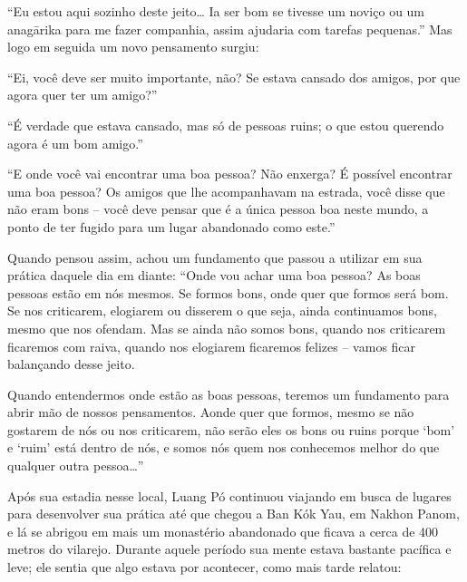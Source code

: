 ``Eu estou aqui sozinho deste jeito\ldots{} Ia ser bom se tivesse um
noviço ou um anagārika para me fazer companhia, assim ajudaria com
tarefas pequenas.'' Mas logo em seguida um novo pensamento surgiu:

``Ei, você deve ser muito importante, não? Se estava cansado dos amigos,
por que agora quer ter um amigo?''

``É verdade que estava cansado, mas só de pessoas ruins; o que estou
querendo agora é um bom amigo.''

``E onde você vai encontrar uma boa pessoa? Não enxerga? É possível
encontrar uma boa pessoa? Os amigos que lhe acompanhavam na estrada,
você disse que não eram bons -- você deve pensar que é a única pessoa
boa neste mundo, a ponto de ter fugido para um lugar abandonado como
este.''

Quando pensou assim, achou um fundamento que passou a utilizar em sua
prática daquele dia em diante: ``Onde vou achar uma boa pessoa? As boas
pessoas estão em nós mesmos. Se formos bons, onde quer que formos será
bom. Se nos criticarem, elogiarem ou disserem o que seja, ainda
continuamos bons, mesmo que nos ofendam. Mas se ainda não somos bons,
quando nos criticarem ficaremos com raiva, quando nos elogiarem
ficaremos felizes -- vamos ficar balançando desse jeito.

Quando entendermos onde estão as boas pessoas, teremos um fundamento
para abrir mão de nossos pensamentos. Aonde quer que formos, mesmo se
não gostarem de nós ou nos criticarem, não serão eles os bons ou ruins
porque `bom' e `ruim' está dentro de nós, e somos nós quem nos
conhecemos melhor do que qualquer outra pessoa\ldots{}''

Após sua estadia nesse local, Luang Pó continuou viajando em busca de
lugares para desenvolver sua prática até que chegou a Ban Kók Yau, em
Nakhon Panom, e lá se abrigou em mais um monastério abandonado que
ficava a cerca de 400 metros do vilarejo. Durante aquele período sua
mente estava bastante pacífica e leve; ele sentia que algo estava por
acontecer, como mais tarde relatou:

